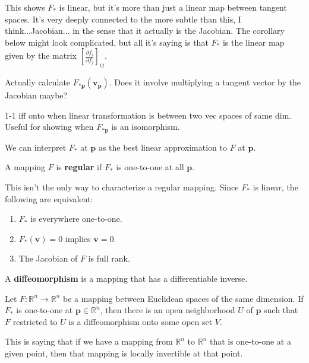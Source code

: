 \documentclass[10pt]{report}
\begin{document}
This shows $F_*$ is linear, but it's more than just a linear map between tangent spaces. It's very deeply connected to the {\color{red}more subtle than this, I think...}Jacobian... in the sense that it actually is the Jacobian. The corollary below might look complicated, but all it's saying is that $F_*$ is the linear map given by the matrix $[\frac{\partial f_i}{\partial f_j} ]_{ij}.$

{\color{red}Actually calculate $F_{*\mathbf{p}}(\mathbf{v}_{\mathbf{p}})$. Does it involve multiplying a tangent vector by the Jacobian maybe?}

{\color{red}1-1 iff onto when linear transformation is between two vec spaces of same dim. Useful for showing when $F_{*\mathbf{p}}$ is an isomorphism.}

\begin{note}
We can interpret $F_*$ at $\mathbf{p}$ as the best linear approximation to $F$ at $\mathbf{p}$.
\end{note}

\begin{defn}[]
A mapping $F$ is \textbf{regular} if $F_*$ is one-to-one at all $\mathbf{p}$.
\end{defn}

This isn't the only way to characterize a regular mapping. Since $F_*$ is linear, the following are equivalent:
\begin{enumerate}
	\item $F_*$ is everywhere one-to-one.
	\item $F_*(\mathbf{v}) = 0$ implies $\mathbf{v}=0.$ 
	\item The Jacobian of $F$ is full rank.
\end{enumerate}

\begin{defn}[]
	A \textbf{diffeomorphism} is a mapping that has a differentiable inverse.
\end{defn}

\begin{thrm}
Let $F:\mathbb{R}^n\to \mathbb{R}^n$ be a mapping between Euclidean spaces of the same dimension. If $F_*$ is one-to-one at $\mathbf{p}\in \mathbb{R}^n$, then there is an open neighborhood $U$ of $\mathbf{p}$ such that $F$ restricted to $U$ is a diffeomorphism onto some open set $V$.
\end{thrm}

This is saying that if we have a mapping from $\mathbb{R}^n$ to $\mathbb{R}^n$ that is one-to-one at a given point, then that mapping is locally invertible at that point.
\end{document}
